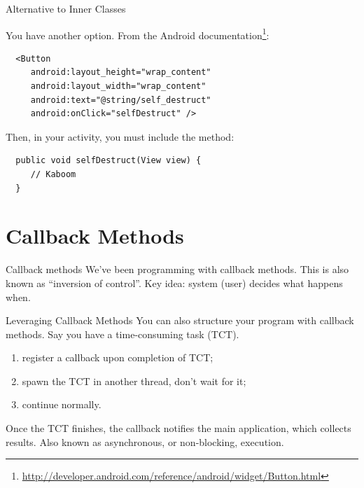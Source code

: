 \documentclass[aspectratio=169]{beamer}
\begin{document}
\begin{frame}[fragile]{Alternative to Inner Classes}

You have another option. From the Android documentation\footnote{\tiny \url{http://developer.android.com/reference/android/widget/Button.html}}:
\begin{verbatim}
  <Button
     android:layout_height="wrap_content"
     android:layout_width="wrap_content"
     android:text="@string/self_destruct"
     android:onClick="selfDestruct" />
\end{verbatim}
\pause
Then, in your activity, you must include the method:
\begin{verbatim}
  public void selfDestruct(View view) {
     // Kaboom
  }
\end{verbatim}
\vspace{0.5em}
\end{frame}


\section*{Callback Methods}



\begin{frame}{Callback methods}
We've been programming with \alert{callback methods}.\vfill
This is also known as ``inversion of control''.\vfill
Key idea: system (user) decides what happens when.
\end{frame}



\begin{frame}{Leveraging Callback Methods}
You can also structure your program with callback methods.
Say you have a time-consuming task (TCT).\vfill
\begin{enumerate}
\item register a callback upon completion of TCT;
\item spawn the TCT in another thread, don't wait for it;
\item continue normally.
\end{enumerate}\vfill
Once the TCT finishes, the callback notifies the main application,
which collects results.\vfill
Also known as asynchronous, or non-blocking, execution.
\end{frame}
\end{document}
